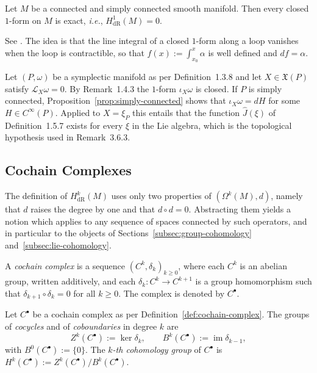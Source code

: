 \begin{proposition}\label{prop:simply-connected}
	Let $M$ be a connected and simply connected smooth manifold. Then every closed $1$-form on $M$ is exact, \textit{i.e.}, $H^1_{\mathrm{dR}}(M)=0$.
\end{proposition}

\noindent See \cite[TODO-location]{TODO-Lee13}. The idea is that the line integral of a closed $1$-form along a loop vanishes when the loop is contractible, so that $f(x):=\int_{x_0}^x\alpha$ is well defined and $df=\alpha$.

\begin{remark}\label{rem:momentum-existence}
	Let $(P,\omega)$ be a symplectic manifold as per Definition~1.3.8 and let $X\in\mathfrak{X}(P)$ satisfy $\mathcal{L}_X\omega=0$. By Remark~1.4.3 the $1$-form $\iota_X\omega$ is closed. If $P$ is simply connected, Proposition~\ref{prop:simply-connected} shows that $\iota_X\omega=dH$ for some $H\in C^\infty(P)$. Applied to $X=\xi_P$ this entails that the function $\hat J(\xi)$ of Definition~1.5.7 exists for every $\xi$ in the Lie algebra, which is the topological hypothesis used in Remark~3.6.3.
\end{remark}

\subsection{Cochain Complexes}\label{subsec:cochain}

The definition of $H^k_{\mathrm{dR}}(M)$ uses only two properties of $(\Omega^k(M),d)$, namely that $d$ raises the degree by one and that $d\circ d=0$. Abstracting them yields a notion which applies to any sequence of spaces connected by such operators, and in particular to the objects of Sections~\ref{subsec:group-cohomology} and~\ref{subsec:lie-cohomology}.

\begin{definition}\label{def:cochain-complex}
	A \emph{cochain complex} is a sequence $(C^k,\delta_k)_{k\geq0}$, where each $C^k$ is an abelian group, written additively, and each $\delta_k:C^k\to C^{k+1}$ is a group homomorphism such that $\delta_{k+1}\circ\delta_k=0$ for all $k\geq0$. The complex is denoted by $C^\bullet$.
\end{definition}

\begin{definition}\label{def:abstract-cohomology}
	Let $C^\bullet$ be a cochain complex as per Definition~\ref{def:cochain-complex}. The groups of \emph{cocycles} and of \emph{coboundaries} in degree $k$ are
	\begin{equation*}
		Z^k(C^\bullet):=\ker\delta_k, \qquad B^k(C^\bullet):=\operatorname{im}\delta_{k-1},
	\end{equation*}
	with $B^0(C^\bullet):=\{0\}$. The \emph{$k$-th cohomology group} of $C^\bullet$ is $H^k(C^\bullet):=Z^k(C^\bullet)/B^k(C^\bullet)$.
\end{definition}

